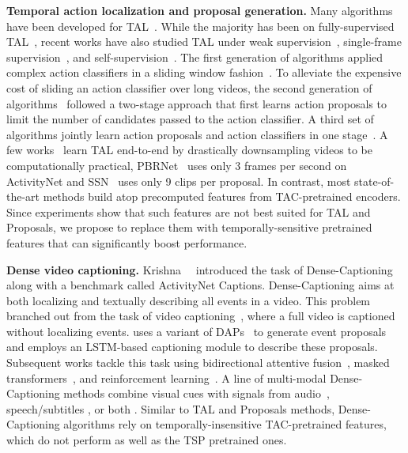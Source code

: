 \documentclass[10pt,twocolumn,letterpaper]{article}
\begin{document}
\vspace{2pt}\noindent\textbf{Temporal action localization and proposal generation.}
Many algorithms have been developed for TAL~\cite{alwassel_2018_actionsearch,dai_iccv_2017,activitynet_challenge,shou_cvpr_2017,yeung_cvpr_2016}. While the majority has been on fully-supervised TAL~\cite{TSA_Net,li2020deep,dbg,liu2020progressive,long2019gaussian}, recent works have also studied TAL under weak supervision~\cite{basnet_aaai20,liu2019weakly,pardo2021refineloc,paul_eccv_2018,shou_eccv_2018}, single-frame supervision~\cite{ma2020sfnet}, and self-supervision~\cite{Jain_2020_CVPR}. The first generation of algorithms applied complex action classifiers in a sliding window fashion~\cite{gaidon_ijcv_2013, oneata_cvpr_2014}. To alleviate the expensive cost of sliding an action classifier over long videos, the second generation of algorithms~\cite{buch_cvpr_2017, gao_iccv_2017,Lin_2019_ICCV,lin_eccv_2018,shou_cvpr_2016,Zeng_2019_ICCV} followed a two-stage approach that first learns action proposals to limit the number of candidates passed to the action classifier. A third set of algorithms jointly learn action proposals and action classifiers in one stage~\cite{chao_cvpr_2018,xu_iccv_2017,xu2020gtad,zhao_iccv_2017}. A few works~\cite{liu2020progressive,zhao_iccv_2017} learn TAL end-to-end by drastically downsampling videos to be computationally practical, \eg PBRNet~\cite{liu2020progressive} uses only 3 frames per second on ActivityNet and SSN~\cite{zhao_iccv_2017} uses only 9 clips per proposal. In contrast, most state-of-the-art methods build atop precomputed features from TAC-pretrained encoders. Since experiments show that such features are not best suited for TAL and Proposals, we propose to replace them with temporally-sensitive pretrained features that can significantly boost performance.

\vspace{2pt}\noindent\textbf{Dense video captioning.}
Krishna~\etal~\cite{activitynet_captions_dataset} introduced the task of Dense-Captioning along with a benchmark called ActivityNet Captions. Dense-Captioning aims at both localizing and textually describing all events in a video. This problem branched out from the task of video captioning~\cite{wang2018video,yan2019stat,pei2019memory}, where a full video is captioned without localizing events. \cite{activitynet_captions_dataset} uses a variant of DAPs~\cite{escorcia2016daps} to generate event proposals and employs an LSTM-based captioning module to describe these proposals. Subsequent works tackle this task using bidirectional attentive fusion~\cite{Wang_2018_CVPR}, masked transformers~\cite{Zhou_2018_CVPR}, and reinforcement  learning~\cite{Li_dvc,sdvc,mft}. A line of multi-modal Dense-Captioning methods combine visual cues with signals from audio~\cite{rahman2019watch}, speech/subtitles \cite{shi2019dense}, or both \cite{bmt,mdvc}. Similar to TAL and Proposals methods, Dense-Captioning algorithms rely on temporally-insensitive TAC-pretrained features, which do not perform as well as the TSP pretrained ones. 
\end{document}
